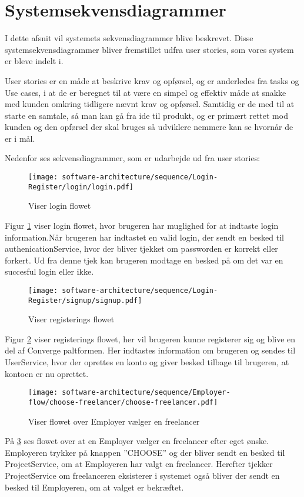 \section{Systemsekvensdiagrammer}

I dette afsnit vil systemets sekvensdiagrammer blive beskrevet. Disse systemsekvensdiagrammer bliver fremstillet udfra user stories, som vores system er bleve indelt i.    



User stories er en måde at beskrive krav og opførsel, og er anderledes fra tasks og Use cases, i at de er beregnet til at være en simpel og effektiv måde at snakke med kunden omkring tidligere nævnt krav og opførsel. Samtidig er de med til at starte en samtale, så man kan gå fra ide til produkt, og er primært rettet mod kunden og den opførsel der skal bruges så udviklere nemmere kan se hvornår de er i mål.

Nedenfor ses sekvensdiagrammer, som er udarbejde ud fra user stories:

\begin{figure}[H]
    \centering
\texttt{[image: software-architecture/sequence/Login-Register/login/login.pdf]}
\caption{Viser login flowet}
\label{fig:auth}
\end{figure}

Figur \ref{fig:auth} viser login flowet, hvor brugeren har muglighed for at indtaste login information.Når brugeren har indtastet en valid login, der sendt en besked til authenicationService, hvor der bliver tjekket om passworden er korrekt eller forkert. Ud fra denne tjek kan brugeren modtage en besked på om det var en succesful login eller ikke. 

\begin{figure}[H]
    \centering
\texttt{[image: software-architecture/sequence/Login-Register/signup/signup.pdf]}
\caption{Viser registerings flowet}
\label{fig:user}
\end{figure}

Figur \ref{fig:user} viser registerings flowet, her vil brugeren kunne registerer sig og blive en del af Converge paltformen. Her indtastes information om brugeren og sendes til UserService, hvor der oprettes en konto og giver besked tilbage til brugeren, at kontoen er nu oprettet.  

\begin{figure}[H]
    \centering
\texttt{[image: software-architecture/sequence/Employer-flow/choose-freelancer/choose-freelancer.pdf]}
\caption{Viser flowet over Employer vælger en freelancer}
\label{fig:chooseAfreelancer}
\end{figure}
På \ref{fig:chooseAfreelancer} ses flowet over at en Employer vælger en freelancer efter eget ønske. Employeren trykker på knappen ''CHOOSE''  og der bliver sendt en besked til ProjectService, om at Employeren har valgt en freelancer. Herefter tjekker ProjectService om freelanceren eksisterer i systemet også bliver der sendt en besked til Employeren, om at valget er bekræftet.


